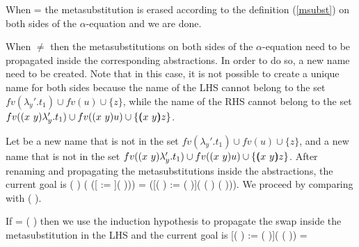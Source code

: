 \begin{coqdoccode}
\end{coqdoccode}
When  =  the metasubstitution is erased according to the definition (\ref{msubst}) on both sides of the $\alpha$-equation and we are done.
\begin{coqdoccode}
\end{coqdoccode}
When  \ensuremath{\not=}  then the metasubstitutions on both sides of the $\alpha$-equation need to be propagated inside the corresponding abstractions. In order to do so, a new name need to be created. Note that in this case, it is not possible to create a unique name for both sides because the name of the LHS cannot belong to the set $fv(\lambda_y'.t_1) \cup fv(u) \cup \{z\}$, while the name of the RHS cannot belong to the set $fv((x\ y) \lambda_y'.t_1) \cup fv((x\ y) u) \cup \{(\!\!(x\ y)\!\!) z\}$.
\begin{coqdoccode}
\end{coqdoccode}
Let  be a new name that is not in the set $fv(\lambda_y'.t_1) \cup fv(u) \cup \{z\}$, and  a new name that is not in the set $fv((x\ y) \lambda_y'.t_1) \cup fv((x\ y) u) \cup \{(\!\!(x\ y)\!\!) z\}$. After renaming and propagating the metasubstitutions inside the abstractions, the current goal is  (   ) (   ([ := ](   ))) =   ([(   ) := (   )]( (   )  (   ))). We proceed by comparing  with (   ).
\begin{coqdoccode}
\end{coqdoccode}
If  = (   ) then we use the induction hypothesis to propagate the swap inside the metasubstitution in the LHS and the current goal is [(   ) := (   )](   (   )) =
